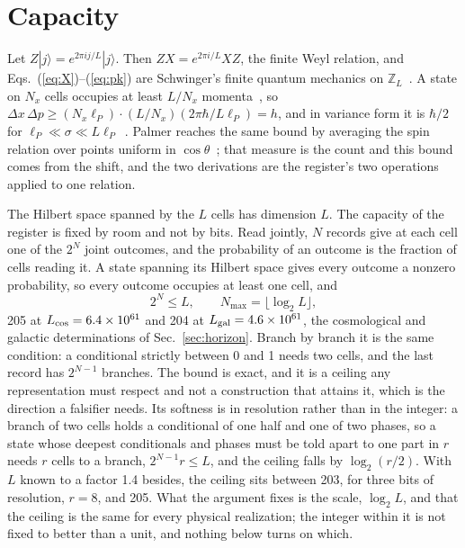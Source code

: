 \documentclass[aps,prd,twocolumn,superscriptaddress,nofootinbib]{revtex4-2}
\begin{document}
\section{Capacity}
\label{sec:capacity}

Let $Z|j\rangle = e^{2\pi ij/L}|j\rangle$. Then $ZX = e^{2\pi i/L}XZ$, the finite Weyl relation, and Eqs.~(\ref{eq:X})--(\ref{eq:pk}) are Schwinger's finite quantum mechanics on $\mathbb{Z}_L$~\cite{weyl1931,schwinger1960,vourdas2004}. A state on $N_x$ cells occupies at least $L/N_x$ momenta~\cite{donoho1989}, so $\Delta x\,\Delta p \ge (N_x\ell_P)\cdot(L/N_x)(2\pi\hbar/L\ell_P) = h$, and in variance form it is $\hbar/2$ for $\ell_P\ll\sigma\ll L\ell_P$~\cite{massar2008}. Palmer reaches the same bound by averaging the spin relation over points uniform in $\cos\theta$~\cite{palmer2026c}; that measure is the count and this bound comes from the shift, and the two derivations are the register's two operations applied to one relation.

The Hilbert space spanned by the $L$ cells has dimension $L$. The capacity of the register is fixed by room and not by bits. Read jointly, $N$ records give at each cell one of the $2^N$ joint outcomes, and the probability of an outcome is the fraction of cells reading it. A state spanning its Hilbert space gives every outcome a nonzero probability, so every outcome occupies at least one cell, and
\begin{equation}
2^N \le L, \qquad N_{\max} = \lfloor \log_2 L \rfloor ,
\label{eq:nmaxspan}
\end{equation}
205 at $L_{\rm cos} = 6.4\times10^{61}$ and 204 at $L_{\rm gal} = 4.6\times10^{61}$, the cosmological and galactic determinations of Sec.~\ref{sec:horizon}. Branch by branch it is the same condition: a conditional strictly between 0 and 1 needs two cells, and the last record has $2^{N-1}$ branches. The bound is exact, and it is a ceiling any representation must respect and not a construction that attains it, which is the direction a falsifier needs. Its softness is in resolution rather than in the integer: a branch of two cells holds a conditional of one half and one of two phases, so a state whose deepest conditionals and phases must be told apart to one part in $r$ needs $r$ cells to a branch, $2^{N-1}r \le L$, and the ceiling falls by $\log_2(r/2)$. With $L$ known to a factor 1.4 besides, the ceiling sits between 203, for three bits of resolution, $r = 8$, and 205. What the argument fixes is the scale, $\log_2 L$, and that the ceiling is the same for every physical realization; the integer within it is not fixed to better than a unit, and nothing below turns on which.
\end{document}

